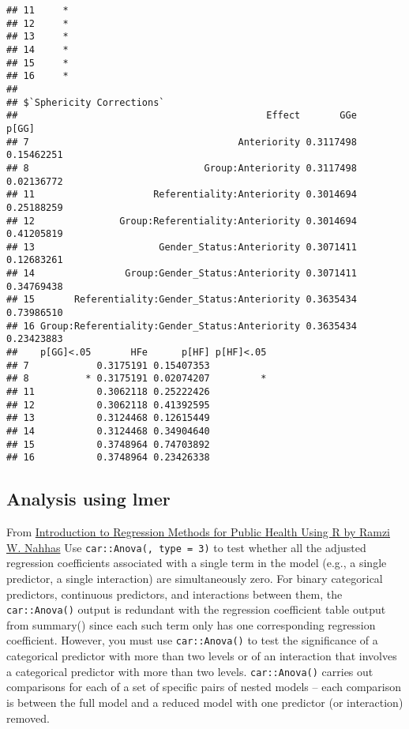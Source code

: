 \documentclass[
]{article}
\begin{document}
\begin{verbatim}
## 11     *
## 12     *
## 13     *
## 14     *
## 15     *
## 16     *
## 
## $`Sphericity Corrections`
##                                            Effect       GGe      p[GG]
## 7                                     Anteriority 0.3117498 0.15462251
## 8                               Group:Anteriority 0.3117498 0.02136772
## 11                     Referentiality:Anteriority 0.3014694 0.25188259
## 12               Group:Referentiality:Anteriority 0.3014694 0.41205819
## 13                      Gender_Status:Anteriority 0.3071411 0.12683261
## 14                Group:Gender_Status:Anteriority 0.3071411 0.34769438
## 15       Referentiality:Gender_Status:Anteriority 0.3635434 0.73986510
## 16 Group:Referentiality:Gender_Status:Anteriority 0.3635434 0.23423883
##    p[GG]<.05       HFe      p[HF] p[HF]<.05
## 7            0.3175191 0.15407353          
## 8          * 0.3175191 0.02074207         *
## 11           0.3062118 0.25222426          
## 12           0.3062118 0.41392595          
## 13           0.3124468 0.12615449          
## 14           0.3124468 0.34904640          
## 15           0.3748964 0.74703892          
## 16           0.3748964 0.23426338
\end{verbatim}

\subsection{Analysis using lmer}\label{analysis-using-lmer}

From
\href{https://www.bookdown.org/rwnahhas/RMPH/mlr-distinctions.html\#}{Introduction
to Regression Methods for Public Health Using R by Ramzi W. Nahhas} Use
\texttt{car::Anova(,\ type\ =\ 3)} to test whether all the adjusted
regression coefficients associated with a single term in the model
(e.g., a single predictor, a single interaction) are simultaneously
zero. For binary categorical predictors, continuous predictors, and
interactions between them, the \texttt{car::Anova()} output is redundant
with the regression coefficient table output from summary() since each
such term only has one corresponding regression coefficient. However,
you must use \texttt{car::Anova()} to test the significance of a
categorical predictor with more than two levels or of an interaction
that involves a categorical predictor with more than two levels.
\texttt{car::Anova()} carries out comparisons for each of a set of
specific pairs of nested models -- each comparison is between the full
model and a reduced model with one predictor (or interaction) removed.
\end{document}
